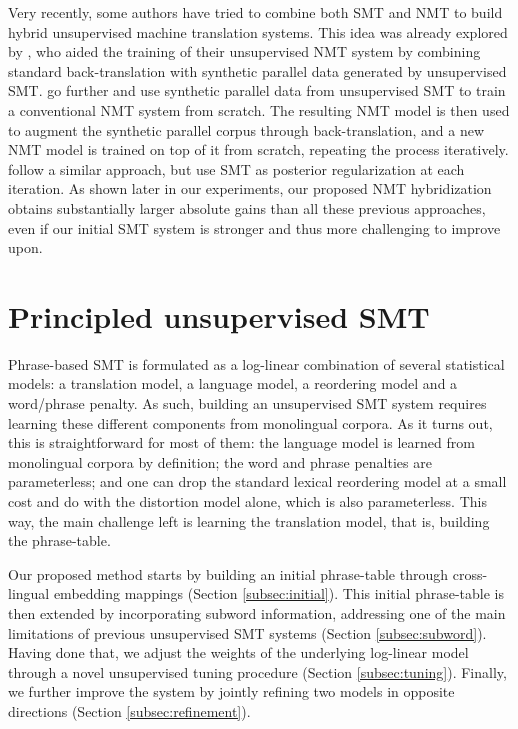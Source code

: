 \documentclass[11pt,a4paper]{article}
\begin{document}
Very recently, some authors have tried to combine both SMT and NMT to build hybrid unsupervised machine translation systems. This idea was already explored by \citet{lample2018phrase}, who aided the training of their unsupervised NMT system by combining standard back-translation with synthetic parallel data generated by unsupervised SMT. \citet{marie2018unsupervised} go further and use synthetic parallel data from unsupervised SMT to train a conventional NMT system from scratch. The resulting NMT model is then used to augment the synthetic parallel corpus through back-translation, and a new NMT model is trained on top of it from scratch, repeating the process iteratively. \citet{ren2019unsupervised} follow a similar approach, but use SMT as posterior regularization at each iteration. As shown later in our experiments, our proposed NMT hybridization obtains substantially larger absolute gains than all these previous approaches, even if our initial SMT system is stronger and thus more challenging to improve upon.


\section{Principled unsupervised SMT}
\label{sec:smt}

Phrase-based SMT is formulated as a log-linear combination of several statistical models: a translation model, a language model, a reordering model and a word/phrase penalty. As such, building an unsupervised SMT system requires learning these different components from monolingual corpora. As it turns out, this is straightforward for most of them: the language model is learned from monolingual corpora by definition; the word and phrase penalties are parameterless; and one can drop the standard lexical reordering model at a small cost and do with the distortion model alone, which is also parameterless. This way, the main challenge left is learning the translation model, that is, building the phrase-table.

Our proposed method starts by building an initial phrase-table through cross-lingual embedding mappings (Section \ref{subsec:initial}). This initial phrase-table is then extended by incorporating subword information, addressing one of the main limitations of previous unsupervised SMT systems (Section \ref{subsec:subword}). Having done that, we adjust the weights of the underlying log-linear model through a novel unsupervised tuning procedure (Section \ref{subsec:tuning}). Finally, we further improve the system by jointly refining two models in opposite directions (Section \ref{subsec:refinement}).
\end{document}
